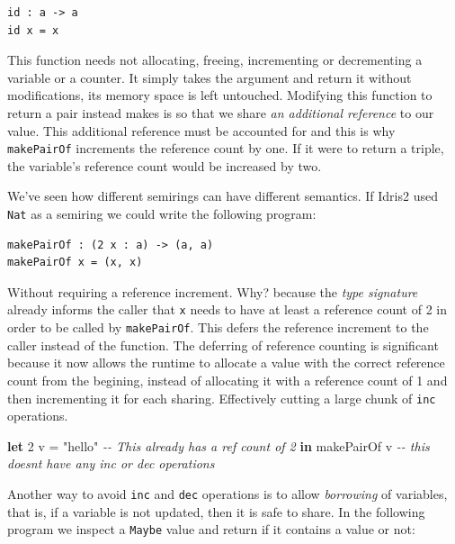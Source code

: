 \documentclass[
]{article}
\newenvironment{Shaded}{}{}
\newcommand{\CommentTok}[1]{\textcolor[rgb]{0.38,0.63,0.69}{\textit{#1}}}
\newcommand{\DecValTok}[1]{\textcolor[rgb]{0.25,0.63,0.44}{#1}}
\newcommand{\KeywordTok}[1]{\textcolor[rgb]{0.00,0.44,0.13}{\textbf{#1}}}
\newcommand{\NormalTok}[1]{#1}
\newcommand{\OtherTok}[1]{\textcolor[rgb]{0.00,0.44,0.13}{#1}}
\newcommand{\StringTok}[1]{\textcolor[rgb]{0.25,0.44,0.63}{#1}}
\begin{document}
\begin{verbatim}
id : a -> a
id x = x
\end{verbatim}

This function needs not allocating, freeing, incrementing or
decrementing a variable or a counter. It simply takes the argument and
return it without modifications, its memory space is left untouched.
Modifying this function to return a pair instead makes is so that we
share \emph{an additional reference} to our value. This additional
reference must be accounted for and this is why \texttt{makePairOf}
increments the reference count by one. If it were to return a triple,
the variable's reference count would be increased by two.

We've seen how different semirings can have different semantics. If
Idris2 used \texttt{Nat} as a semiring we could write the following
program:

\begin{verbatim}
makePairOf : (2 x : a) -> (a, a)
makePairOf x = (x, x)
\end{verbatim}

Without requiring a reference increment. Why? because the \emph{type
signature} already informs the caller that \texttt{x} needs to have at
least a reference count of 2 in order to be called by
\texttt{makePairOf}. This defers the reference increment to the caller
instead of the function. The deferring of reference counting is
significant because it now allows the runtime to allocate a value with
the correct reference count from the begining, instead of allocating it
with a reference count of 1 and then incrementing it for each sharing.
Effectively cutting a large chunk of \texttt{inc} operations.

\begin{Shaded}
\begin{Highlighting}[]
\KeywordTok{let} \DecValTok{2}\NormalTok{ v }\OtherTok{=} \StringTok{"hello"} \CommentTok{{-}{-} This already has a ref count of 2}
 \KeywordTok{in}\NormalTok{ makePairOf v }\CommentTok{{-}{-} this doesn\textquotesingle{}t have any inc or dec operations}
\end{Highlighting}
\end{Shaded}

Another way to avoid \texttt{inc} and \texttt{dec} operations is to
allow \emph{borrowing} of variables, that is, if a variable is not
updated, then it is safe to share. In the following program we inspect a
\texttt{Maybe} value and return if it contains a value or not:
\end{document}

